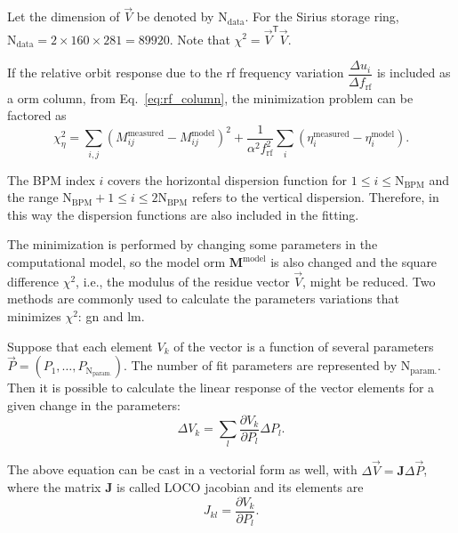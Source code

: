 Let the dimension of $\vec{V}$ be denoted by $\mathrm{N}_{\mathrm{data}}$. For the Sirius storage ring, $\mathrm{N}_{\mathrm{data}} = 2 \times 160 \times 281 = 89920$. Note that $\chi^2 = \vec{V}^{\mathsf{T}}\vec{V}$.

If the relative orbit response due to the \gls{rf} frequency variation $\dfrac{\Delta u_i}{\Delta f_{\mathrm{rf}}}$ is included as a \gls{orm} column, from Eq.~\eqref{eq:rf_column}, the minimization problem can be factored as
\begin{equation}
    \chi^2_{\eta} = \sum_{i, j} \left(M^{\mathrm{measured}}_{ij} - M^{\mathrm{model}}_{ij}\right)^2 + \dfrac{1}{\alpha^2 f_{\mathrm{rf}}^2}\sum_{i}\left(\eta^{\mathrm{measured}}_{i} - \eta^{\mathrm{model}}_{i}\right).
    \label{eq:chi2_disp}
\end{equation}

The BPM index $i$ covers the horizontal dispersion function for $1 \leq i \leq \mathrm{N}_{\mathrm{BPM}}$ and the range $\mathrm{N}_{\mathrm{BPM}}+1 \leq i \leq 2\mathrm{N}_{\mathrm{BPM}}$ refers to the vertical dispersion. Therefore, in this way the dispersion functions are also included in the fitting.

The minimization is performed by changing some parameters in the computational model, so the model \gls{orm} $\mathbf{M}^{\mathrm{model}}$ is also changed and the square difference $\chi^2$, i.e., the modulus of the residue vector $\vec{V}$, might be reduced. Two methods are commonly used to calculate the parameters variations that minimizes $\chi^2$: \gls{gn} and \gls{lm}.

Suppose that each element $V_k$ of the vector is a function of several parameters $\vec{P} = \left(P_1, \ldots, P_{\mathrm{N}_{\mathrm{param.}}}\right)$. The number of fit parameters are represented by $\mathrm{N}_{\mathrm{param.}}$. Then it is possible to calculate the linear response of the vector elements for a given change in the parameters:
\begin{equation}
\Delta V_{k} = \sum_{l}\dfrac{\partial V_{k}}{\partial P_{l}} \Delta P_{l}.
\label{eq:loco_params}
\end{equation}

The above equation can be cast in a vectorial form as well, with $\Delta \vec{V} = \mathbf{J}\Delta \vec{P}$, where the matrix $\mathbf{J}$ is called LOCO jacobian and its elements are 
\begin{equation}
    J_{kl} = \dfrac{\partial V_{k}}{\partial P_{l}}.
\end{equation}

